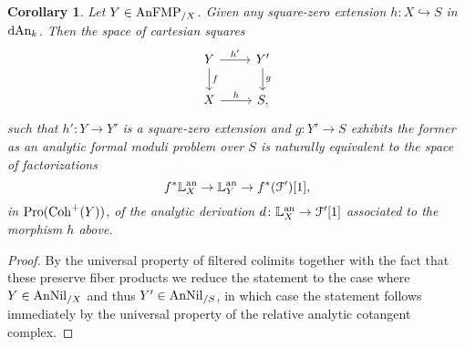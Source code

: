 \documentclass[10pt,a4paper,reqno]{amsart} %
\theoremstyle{plain}
\newtheorem{cor}[thm]{Corollary}
\theoremstyle{definition}
\theoremstyle{remark}
\numberwithin{equation}{section}
\begin{document}
\begin{cor} \label{cor:construction_of_square_zero_extensions_for_analytic_FMP_using_univ_property_of_cotangent_complex}
    Let $Y \in \mathrm{AnFMP}_{/X}$. Given any square-zero extension $h \colon X \hookrightarrow S$ in $\mathrm{dAn}_k$. Then the space of cartesian squares
        \[
        \begin{tikzcd}
            Y \ar{r}{h'} \ar{d}{f} & Y' \ar{d}{g} \\
            X \ar{r}{h} & S,
        \end{tikzcd}
        \]
    such that $h' \colon Y \to Y'$ is a square-zero extension and $g \colon Y' \to S$ exhibits the former
    as an analytic formal moduli problem over $S$ is naturally equivalent to the space of factorizations
        \[
            f^* \mathbb L^\mathrm{an}_X \to \mathbb L^\mathrm{an}_Y \to f^*( \mathcal F')[1],
        \]
    in $\mathrm{Pro}(\mathrm{Coh}^+(Y))$, of the analytic derivation $d \colon \mathbb L^\mathrm{an}_X \to \mathcal F'[1]$ associated to the morphism $h$ above.
\end{cor}

\begin{proof}
    By the universal property of filtered colimits together with the fact that these preserve fiber products we reduce the statement to the case where $Y \in \mathrm{AnNil}_{/X}$ and thus $Y' \in \mathrm{AnNil}_{/S}$, in which
    case the statement follows immediately by the universal property of the relative analytic cotangent complex.
\end{proof}
\end{document}
